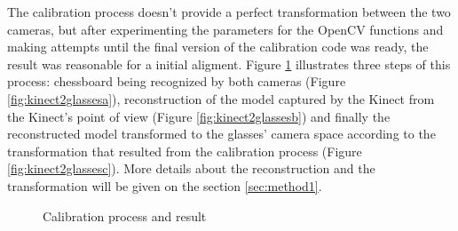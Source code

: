 \documentclass[msc, a4paper, classic, en]{ufbathesis}
\begin{document}
The calibration process doesn't provide a perfect transformation between the two cameras, but after experimenting the parameters for the OpenCV functions and making attempts until the final version of the calibration code was ready, the result was reasonable for a initial aligment. Figure \ref{fig:kinect2glasses} illustrates three steps of this process: chessboard being recognized by both cameras (Figure \ref{fig:kinect2glassesa}), reconstruction of the model captured by the Kinect from the Kinect's point of view (Figure \ref{fig:kinect2glassesb}) and finally the reconstructed model transformed to the glasses' camera space according to the transformation that resulted from the calibration process (Figure \ref{fig:kinect2glassesc}). More details about the reconstruction and the transformation will be given on the section \ref{sec:method1}.

\begin{figure}
\centering
{}
\caption{Calibration process and result}
\label{fig:kinect2glasses}
\end{figure}
\end{document}
